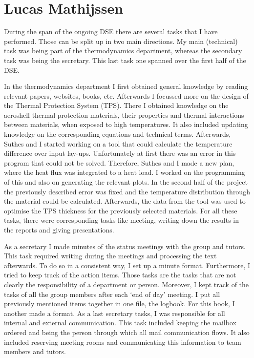 \section{Lucas Mathijssen}
During the span of the ongoing DSE there are several tasks that I have performed. Those can be split up in two main directions. My main (technical) task was being part of the thermodynamics department, whereas the secondary task was being the secretary. This last task one spanned over the first half of the DSE.

In the thermodynamics department I first obtained general knowledge by reading relevant papers, websites, books, etc. Afterwards I focussed more on the design of the Thermal Protection System (TPS). There I obtained knowledge on the aeroshell thermal protection materials, their properties and thermal interactions between materials, when exposed to high temperatures. It also included updating knowledge on the corresponding equations and technical terms. Afterwards, Suthes and I started working on a tool that could calculate the temperature difference over input lay-ups. Unfortunately at first there was an error in this program that could not be solved. Therefore, Suthes and I made a new plan, where the heat flux was integrated to a heat load. I worked on the programming of this and also on generating the relevant plots. In the second half of the project the previously described error was fixed and the temperature distribution through the material could be calculated. Afterwards, the data from the tool was used to optimise the TPS thickness for the previously selected materials. For all these tasks, there were corresponding tasks like meeting, writing down the results in the reports and giving presentations.

As a secretary I made minutes of the status meetings with the group and tutors. This task required writing during the meetings and processing the text afterwards. To do so in a consistent way, I set up a minute format. Furthermore, I tried to keep track of the action items. Those tasks are the tasks that are not clearly the responsibility of a department or person.  Moreover, I kept track of the tasks of all the group members after each ‘end of day’ meeting. I put all previously mentioned items together in one file, the logbook. For this book, I another made a format. As a last secretary tasks, I was responsible for all internal and external communication. This task included keeping the mailbox ordered and being the person through which all mail communication flows. It also included reserving meeting rooms and communicating this information to team members and tutors.

